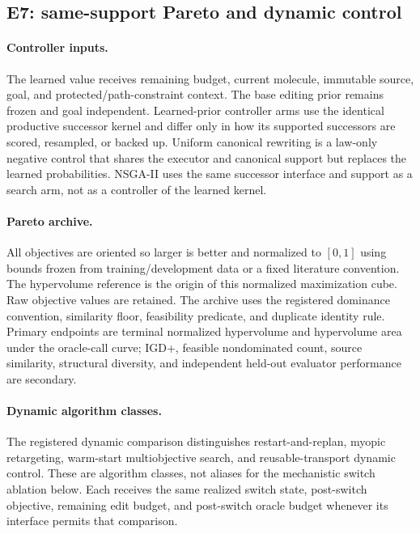 \subsection{E7: same-support Pareto and dynamic control}
\label{app:e7-protocol}

\paragraph{Controller inputs.}
The learned value receives remaining budget, current molecule, immutable
source, goal, and protected/path-constraint context. The base editing prior
remains frozen and goal independent. Learned-prior controller arms use the
identical productive successor kernel and differ only in how its supported
successors are scored, resampled, or backed up. Uniform canonical rewriting is
a law-only negative control that shares the executor and canonical support but
replaces the learned probabilities. NSGA-II uses the same successor interface
and support as a search arm, not as a controller of the learned kernel.

\paragraph{Pareto archive.}
All objectives are oriented so larger is better and normalized to $[0,1]$
using bounds frozen from training/development data or a fixed literature
convention.  The hypervolume reference is the origin of this normalized
maximization cube.  Raw objective values are retained.  The archive uses the
registered dominance convention, similarity floor, feasibility predicate, and
duplicate identity rule.  Primary endpoints are terminal normalized
hypervolume and hypervolume area under the oracle-call curve; IGD+, feasible
nondominated count, source similarity, structural diversity, and independent
held-out evaluator performance are secondary.

\paragraph{Dynamic algorithm classes.}
The registered dynamic comparison distinguishes restart-and-replan, myopic
retargeting, warm-start multiobjective search, and reusable-transport dynamic
control. These are algorithm classes, not aliases for the mechanistic switch
ablation below. Each receives the same realized switch state, post-switch
objective, remaining edit budget, and post-switch oracle budget whenever its
interface permits that comparison.


